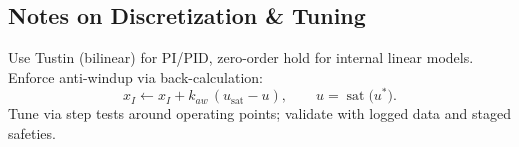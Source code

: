 \documentclass[11pt,a4paper]{article}
\begin{document}
	\subsection*{Notes on Discretization \& Tuning}
	Use Tustin (bilinear) for PI/PID, zero-order hold for internal linear models. Enforce anti-windup via back-calculation:
	$$
	x_I \gets x_I + k_{aw}\,(u_{\text{sat}}-u),\qquad u = \operatorname{sat}(u^{*}\big).
	$$
	Tune via step tests around operating points; validate with logged data and staged safeties.
	
\end{document}
